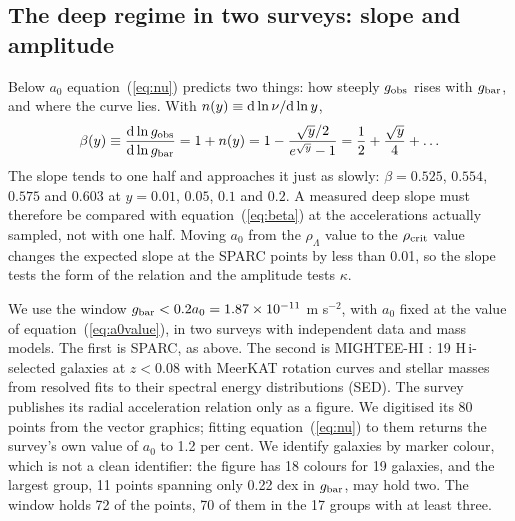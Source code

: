 \documentclass[fleqn,usenatbib]{mnras}
\begin{document}
\subsection{The deep regime in two surveys: slope and amplitude}
\label{sec:deepregime}
Below $a_0$ equation~(\ref{eq:nu}) predicts two things: how steeply $g_{\rm obs}$ rises with $g_{\rm bar}$, and where the curve lies. With $n(y)\equiv{\rm d}\ln\nu/{\rm d}\ln y$,
\begin{equation}
\beta(y)\equiv\frac{{\rm d}\ln g_{\rm obs}}{{\rm d}\ln g_{\rm bar}}=1+n(y)=1-\frac{\sqrt y/2}{e^{\sqrt y}-1}=\frac12+\frac{\sqrt y}{4}+\ldots
\label{eq:beta}
\end{equation}
The slope tends to one half and approaches it just as slowly: $\beta=0.525$, $0.554$, $0.575$ and $0.603$ at $y=0.01$, $0.05$, $0.1$ and $0.2$. A measured deep slope must therefore be compared with equation~(\ref{eq:beta}) at the accelerations actually sampled, not with one half. Moving $a_0$ from the $\rho_\Lambda$ value to the $\rho_{\rm crit}$ value changes the expected slope at the SPARC points by less than 0.01, so the slope tests the form of the relation and the amplitude tests $\kappa$.

We use the window $g_{\rm bar}<0.2a_0=1.87\times10^{-11}$ m s$^{-2}$, with $a_0$ fixed at the value of equation~(\ref{eq:a0value}), in two surveys with independent data and mass models. The first is SPARC, as above. The second is MIGHTEE-HI \citep{Varasteanu2025}: 19 H\,{\sc i}-selected galaxies at $z<0.08$ with MeerKAT rotation curves and stellar masses from resolved fits to their spectral energy distributions (SED). The survey publishes its radial acceleration relation only as a figure. We digitised its 80 points from the vector graphics; fitting equation~(\ref{eq:nu}) to them returns the survey's own value of $a_0$ to 1.2 per cent. We identify galaxies by marker colour, which is not a clean identifier: the figure has 18 colours for 19 galaxies, and the largest group, 11 points spanning only 0.22 dex in $g_{\rm bar}$, may hold two. The window holds 72 of the points, 70 of them in the 17 groups with at least three.
\end{document}

